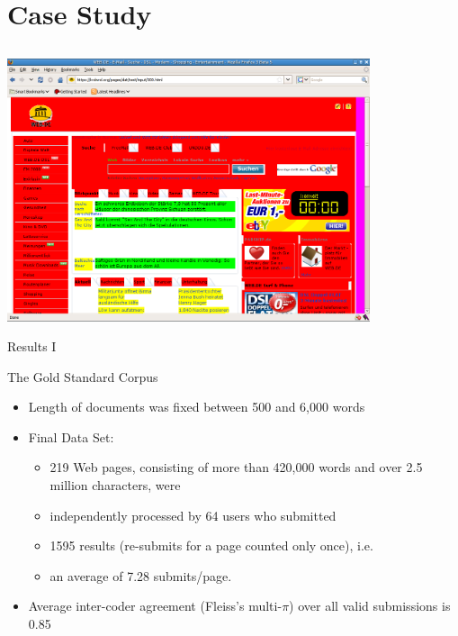 \documentclass{beamer}
\begin{document}
\section{Case Study}
\subsection*{}
    \begin{frame}
        \frametitle{}
        \begin{center}
            \includegraphics[width=0.8\textwidth]{shot1}
        \end{center}
    \end{frame}

    \begin{frame}{Results I}

        \begin{block}{The Gold Standard Corpus}
            \begin{itemize}
                \item Length of documents was fixed between 500 and 6,000 words
                \item Final Data Set:
            \begin{itemize}
                \item 219 Web pages, consisting of more than 420,000 words and over 2.5 million characters, were
                \item independently processed by 64 users who submitted 
                \item 1595 results (re-submits for a page counted only once), i.e. 
                \item an average of 7.28 submits/page.
            \end{itemize}
            \item Average inter-coder agreement (Fleiss's multi-$\pi$) over all valid submissions is 0.85 
            \end{itemize}
        \end{block}

    \end{frame}
\end{document}
